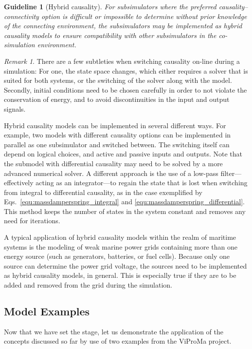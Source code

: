 \documentclass[prb,aps,showpacs,floatfix,twocolumn,10pt]{revtex4-1}
\newcommand{\sub}{subsimulator}
\newcommand{\guidelineCausality}{%
	For \sub{}s where the preferred causality--connectivity option is difficult or impossible to determine without prior knowledge of the connecting environment, the \sub{}s may be implemented as hybrid causality models to ensure compatibility with other \sub{}s in the co-simulation environment.
}
\theoremstyle{plain}
\newtheorem{guideline}{Guideline}
\theoremstyle{remark}
\newtheorem{remark}{Remark}[guideline]
\begin{document}
\begin{guideline}[Hybrid causality]
\label{guideline:Causality}
	\guidelineCausality{}
\end{guideline}

\begin{remark}
	There are a few subtleties when switching causality on-line during a simulation:
	For one, the state space changes, which either requires a solver that is suited for both systems, or the switching of the solver along with the model.
	Secondly, initial conditions need to be chosen carefully in order to not violate the conservation of energy, and to avoid discontinuities in the input and output signals.
\end{remark}

Hybrid causality models can be implemented in several different ways.
For example, two models with different causality options can be implemented in parallel as one \sub{} and switched between.
The switching itself can depend on logical choices, and active and passive inputs and outputs.
Note that the submodel with differential causality may need to be solved by a more advanced numerical solver.
A different approach\cite{Skjong2016b} is the use of a low-pass filter---effectively acting as an integrator---to regain the state that is lost when switching from integral to differential causality, as in the case exemplified by Eqs.~\eqref{equ:massdamperspring_integral} and \eqref{equ:massdamperspring_differential}.
This method keeps the number of states in the system constant and removes any need for iterations.

A typical application of hybrid causality models within the realm of maritime systems is the modeling of weak marine power grids containing more than one energy source (such as generators, batteries, or fuel cells).
Because only one source can determine the power grid voltage, the sources need to be implemented as hybrid causality models, in general.
This is especially true if they are to be added and removed from the grid during the simulation.\cite{Skjong2017}


\subsection{Model Examples}
\label{subsec:construction:model_examples}

Now that we have set the stage, let us demonstrate the application of the concepts discussed so far by use of two examples from the ViProMa project.
\end{document}
